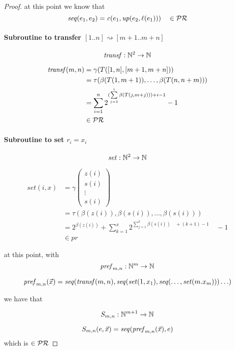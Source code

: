 \begin{theorem}
\begin{proof}
    at this point we know that
    \[
      \mathit{seq}({e_1, e_2}) = \mathit{c}({e_1, \mathit{up}({e_2, \ell(e_1)})}) \quad \in \mathcal{PR}
    \]

    \paragraph{\textbf{Subroutine to transfer $[1 .. n] \rightsquigarrow [m+1 .. m+n]$}}
    \newcommand{\tran}[1]{\ensuremath{\mathit{transf}({#1})}}
    \[
      \mathit{transf}: \mathbb{N}^2 \rightarrow \mathbb{N}
    \]

    \[
      \begin{aligned}
        \tran{m,n} &= \gamma(T([1,n],[m+1, m+n])) \\
        &= \tau(\beta(T(1,m+1)), \dots, \beta(T(n,n+m))) \\
        &= \sum\limits^n_{i=1}2^{(\sum\limits^i_{j=1}\beta(T(j,m+j))) + i - 1}-1 \\
        &\in \pr
      \end{aligned}
    \]

    \paragraph{\textbf{Subroutine to set $r_i = x_i$}}
    \newcommand{\set}[1]{\ensuremath{\mathit{set}({#1})}}
    \[
      \mathit{set} : \mathbb{N}^2 \rightarrow \mathbb{N}
    \]

    \[
      \begin{aligned}
        \set{i,x} &= \gamma\left( \begin{array}{c}
                                    z(i) \\
                                    s(i) \\
                                    \vdots \\
                                    s(i)
                                  \end{array} \right) \\
        &= \tau(\beta(z(i)), \beta(s(i)), \dots, \beta(s(i))) \\
        &= 2^{\beta(z(i))} + \sum^x_{k=1}2^{\sum\limits^k_{j=1}\beta(s(i)) \quad + (k+1)-1} \quad -1 \\
        &\in pr
      \end{aligned}
    \]

    at this point, with
    \newcommand{\pref}[1]{\ensuremath{\mathit{pref}_{m,n}({#1})}}
    \[
      \mathit{pref}_{m,n}: \mathbb{N}^m \rightarrow \mathbb{N}
    \]

    \[
      \pref{\vec{x}} = \seq{\tran{m,n}, \seq{\set{1,x_1}, \seq{\dots , \set{m.x_m}}} \dots}
    \]

    we have that

    \[
      S_{m,n}: \mathbb{N}^{m+1} \rightarrow \mathbb{N}
    \]

    \[
      S_{m,n}(e, \vec{x}) = \seq{\pref{\vec{x}}, e}
    \]
    which is $\in \mathcal{PR}$
  \end{proof}
\end{theorem}

